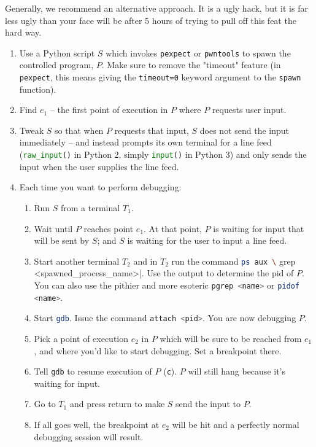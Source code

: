 \documentclass{article}
\newcommand{\xcode}[2]{\colorbox{ubuntuback}{\lstinline[language=#1]|#2|}}
\newcommand{\code}[1]{\colorbox{ubuntuback}{\texttt{#1}}}
\newcommand{\gdb}[1]{\xcode{C}{#1}}
\begin{document}
Generally, we recommend an alternative approach. It is a ugly hack, but it is far less ugly than your face will be after 5 hours of trying to pull off this feat the hard way. 
\begin{enumerate}
    \item Use a Python script $S$ which invokes \xcode{python}{pexpect} or \xcode{python}{pwntools} to spawn the controlled program, $P$. Make sure to remove the "timeout" feature (in \code{pexpect}, this means giving the \code{timeout=0} keyword argument to the \code{spawn} function).
    \item Find $e_1$ -- the first point of execution in $P$ where $P$ requests user input. 
    \item Tweak $S$ so that when $P$ requests that input, $S$ does not send the input immediately -- and instead prompts its own terminal for a line feed (\xcode{python}{raw_input()} in Python 2, simply \xcode{python}{input()} in Python 3) and only sends the input when the user supplies the line feed.
    \item Each time you want to perform debugging:
    \begin{enumerate}
        \item Run $S$ from a terminal $T_1$. 
        \item Wait until $P$ reaches point $e_1$. At that point, $P$ is waiting for input that will be sent by $S$; and $S$ is waiting for the user to input a line feed.
        \item Start another terminal $T_2$ and in $T_2$ run the command \xcode{bash}{ps aux \| grep <spawned_process_name>}. Use the output to determine the pid of $P$. You can also use the pithier and more esoteric \xcode{bash}{pgrep <name>} or \xcode{bash}{pidof <name>}.
        \item Start \xcode{bash}{gdb}. Issue the command \gdb{attach <pid>}. You are now debugging $P$.
        \item Pick a point of execution $e_2$ in $P$ which will be sure to be reached from $e_1$, and where you'd like to start debugging. Set a breakpoint there. 
        \item Tell \code{gdb} to resume execution of $P$ (\gdb{c}). $P$ will still hang because it's waiting for input. 
        \item Go to $T_1$ and press return to make $S$ send the input to $P$. 
        \item If all goes well, the breakpoint at $e_2$ will be hit and a perfectly normal debugging session will result.
    \end{enumerate}
\end{enumerate}
\end{document}
